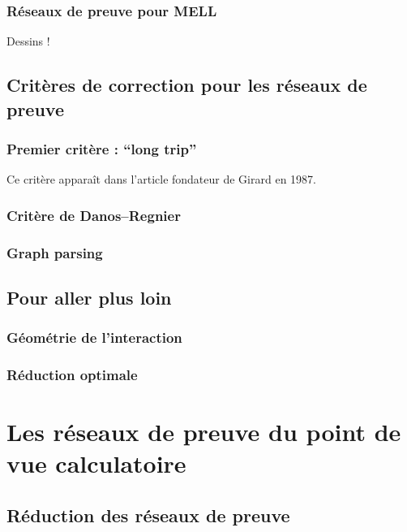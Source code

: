 \documentclass[a4paper, 11pt]{article}
\begin{document}
\subsubsection{Réseaux de preuve pour MELL}

Dessins !



\subsection{Critères de correction pour les réseaux de preuve}


\subsubsection{Premier critère : \enquote{long trip}}

Ce critère apparaît dans l'article fondateur de Girard en 1987.


\subsubsection{Critère de Danos--Regnier}


\subsubsection{Graph parsing}



\subsection{Pour aller plus loin}

\subsubsection{Géométrie de l'interaction}

\subsubsection{Réduction optimale}


\section{Les réseaux de preuve du point de vue calculatoire}

\subsection{Réduction des réseaux de preuve}
\end{document}
